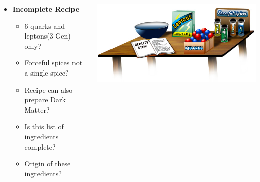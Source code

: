 \documentclass{beamer}
\begin{document}
\begin{frame}
\begin{minipage}[t]{0.9\paperwidth}
\begin{columns}
\begin{column}{0.45\linewidth}
   \end{column}
 \end{columns}
 \end{minipage}
 \vspace{-0.1cm}
 \begin{minipage}[b]{0.70\paperwidth}
    \begin{columns}
      \begin{column}{0.80\linewidth}
       \begin{itemize}
       \item \textcolor{UMN@Maroon}{\textbf{Incomplete Recipe}}
         \begin{itemize}
           \item 6 quarks and leptons(3 Gen) only?
           \item Forceful spices not a single spice?
           \item Recipe can also prepare Dark Matter?
           \item Is this list of ingredients complete?
           \item Origin of these ingredients?
         \end{itemize}
        \end{itemize}
      \end{column}   
      \begin{column}{0.45\linewidth}
      \mbox{\includegraphics[height=0.85\textwidth, width=0.85\linewidth]{THESISPLOTS/New-Physics-PLOTS/Reality_Recipe_stew.jpg}}
      \end{column}      
     \end{columns} 
  
 
 \end{minipage}
\end{frame}
\end{document}
